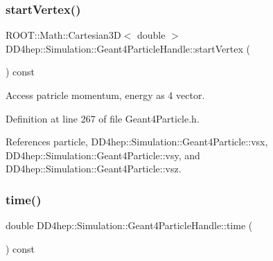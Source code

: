 \hypertarget{class_d_d4hep_1_1_simulation_1_1_geant4_particle_handle_a428ea2cb742ab56680e874ff14252215}{}\label{class_d_d4hep_1_1_simulation_1_1_geant4_particle_handle_a428ea2cb742ab56680e874ff14252215} 
\subsubsection{\texorpdfstring{start\+Vertex()}{startVertex()}}
{\footnotesize\ttfamily R\+O\+O\+T\+::\+Math\+::\+Cartesian3D$<$ double $>$ D\+D4hep\+::\+Simulation\+::\+Geant4\+Particle\+Handle\+::start\+Vertex (\begin{DoxyParamCaption}{ }\end{DoxyParamCaption}) const\hspace{0.3cm}{\ttfamily [inline]}}



Access patricle momentum, energy as 4 vector. 



Definition at line 267 of file Geant4\+Particle.\+h.



References particle, D\+D4hep\+::\+Simulation\+::\+Geant4\+Particle\+::vsx, D\+D4hep\+::\+Simulation\+::\+Geant4\+Particle\+::vsy, and D\+D4hep\+::\+Simulation\+::\+Geant4\+Particle\+::vsz.

\hypertarget{class_d_d4hep_1_1_simulation_1_1_geant4_particle_handle_a3d11ffef1c5568f7849c3073042375a4}{}\label{class_d_d4hep_1_1_simulation_1_1_geant4_particle_handle_a3d11ffef1c5568f7849c3073042375a4} 
\subsubsection{\texorpdfstring{time()}{time()}}
{\footnotesize\ttfamily double D\+D4hep\+::\+Simulation\+::\+Geant4\+Particle\+Handle\+::time (\begin{DoxyParamCaption}{ }\end{DoxyParamCaption}) const\hspace{0.3cm}{\ttfamily [inline]}}



